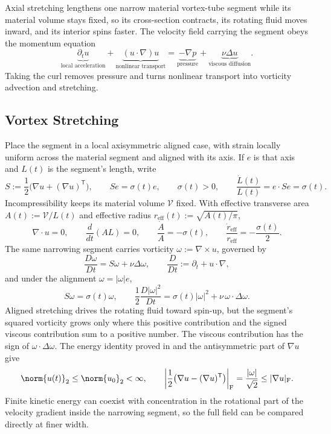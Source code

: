 
Axial stretching lengthens one narrow material vortex-tube segment while its material volume stays fixed, so its cross-section contracts, its rotating fluid moves inward, and its interior spins faster. The velocity field carrying the segment obeys the momentum equation
\[
  \underbrace{\partial_t u}_{\text{local acceleration}}
  +
  \underbrace{(u\cdot\nabla)u}_{\text{nonlinear transport}}
  =
  \underbrace{-\nabla p}_{\text{pressure}}
  +
  \underbrace{\nu\Delta u}_{\text{viscous diffusion}}.
\]
Taking the curl removes pressure and turns nonlinear transport into vorticity advection and stretching.

\subsection{Vortex Stretching}\label{sub:ThePerfectlyStretchingVortex}

Place the segment in a local axisymmetric aligned case, with strain locally uniform across the material segment and aligned with its axis. If \(e\) is that axis and \(L(t)\) is the segment's length, write
\[
  S:=\frac12\bigl(\nabla u+(\nabla u)^{\mathsf T}\bigr),
  \qquad
  Se=\sigma(t)e,
  \qquad
  \sigma(t)>0,
  \qquad
  \frac{\dot L(t)}{L(t)}
  =
  e\cdot Se
  =
  \sigma(t).
\]
Incompressibility keeps its material volume \(\mathcal V\) fixed. With effective transverse area \(A(t):=\mathcal V/L(t)\) and effective radius \(r_{\mathrm{eff}}(t):=\sqrt{A(t)/\pi}\),
\[
  \nabla\cdot u=0,
  \qquad
  \frac{d}{dt}(A L)=0,
  \qquad
  \frac{\dot A}{A}=-\sigma(t),
  \qquad
  \frac{\dot r_{\mathrm{eff}}}{r_{\mathrm{eff}}}
  =
  -\frac{\sigma(t)}{2}.
\]
The same narrowing segment carries vorticity \(\omega:=\nabla\times u\), governed by
\[
  \frac{D\omega}{Dt}
  =
  S\omega+\nu\Delta\omega,
  \qquad
  \frac{D}{Dt}
  :=
  \partial_t+u\cdot\nabla,
\]
and under the alignment \(\omega=|\omega|e\),
\[
  S\omega
  =
  \sigma(t)\omega,
  \qquad
  \frac12\frac{D|\omega|^2}{Dt}
  =
  \sigma(t)|\omega|^2
  +
  \nu\,\omega\cdot\Delta\omega.
\]
Aligned stretching drives the rotating fluid toward spin-up, but the segment's squared vorticity grows only where this positive contribution and the signed viscous contribution sum to a positive number. The viscous contribution has the sign of \(\omega\cdot\Delta\omega\). The energy identity proved in  and the antisymmetric part of \(\nabla u\) give
\[
  \norm{u(t)}_2
  \leq
  \norm{u_0}_2
  <\infty,
  \qquad
  \left|\frac12\bigl(\nabla u-(\nabla u)^{\mathsf T}\bigr)\right|_{\mathrm F}
  =
  \frac{|\omega|}{\sqrt2}
  \leq
  |\nabla u|_{\mathrm F}.
\]
Finite kinetic energy can coexist with concentration in the rotational part of the velocity gradient inside the narrowing segment, so the full field can be compared directly at finer width.


